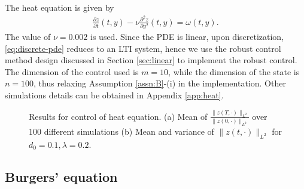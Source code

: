 \documentclass[10pt,a4paper]{amsart}
\begin{document}
The heat equation is given by 
\begin{align*}
    \frac{\partial z}{\partial t}(t,y) - \nu \frac{\partial^2 z}{\partial y^2}(t,y) = \omega(t,y).
\end{align*}
The value of $\nu = 0.002$ is used. Since the PDE is linear, upon discretization, \eqref{eq:discrete-pde} reduces to an LTI system, hence we use the robust control method design discussed in Section \ref{sec:linear} to implement the robust control. The dimension of the control used is $m=10$, while the dimension of the state is $n=100$, thus relaxing Assumption \ref{assn:B}-(i) in the implementation.  Other simulations details can be obtained in Appendix \ref{app:heat}.
\begin{figure}
\centering
    \begin{subfigure}[b]{0.45\textwidth}
        \centering
        
        \caption{}
        \label{fig:heatmap-heat}
    \end{subfigure}
%
    \begin{subfigure}[b]{0.45\textwidth}
        \centering
        
        \caption{}
        \label{fig:time-heat}
    \end{subfigure}
\caption{Results for control of heat equation. (a) Mean of $\frac{\|z(T,\cdot)\|_{L^2}}{\|z(0,\cdot)\|_{L^2}}$ over 100 different simulations (b) Mean and variance of $\|z(t,\cdot)\|_{L^2}$ for $d_0=0.1, \lambda=0.2$. }
\label{fig:heat}
\end{figure}


\subsection{Burgers' equation}
\end{document}
